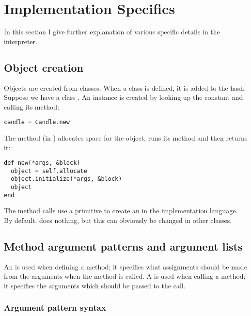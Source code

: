 \section{Implementation Specifics}
\label{sec:implementation_specifics}

In this section I give further explanation of various specific details in the interpreter.

\subsection{Object creation}

Objects are created from classes. When a class is defined, it is added to the  hash. Suppose we have a class . An instance is created by looking up the  constant and calling its  method:

\begin{lstlisting}
candle = Candle.new
\end{lstlisting}

The  method (in ) allocates space for the object, runs its  method and then returns it:

\begin{lstlisting}
def new(*args, &block)
  object = self.allocate
  object.initialize(*args, &block)
  object
end
\end{lstlisting}

The  method calls use a primitive to create an  in the implementation language. By default,  does nothing, but this can obviously be changed in other classes.

\subsection{Method argument patterns and argument lists}
\label{sec:arguments}

An  is used when defining a method; it specifies what assignments should be made from the arguments when the method is called. A  is used when calling a method; it specifies the arguments which should be passed to the call.

\subsubsection{Argument pattern syntax}

